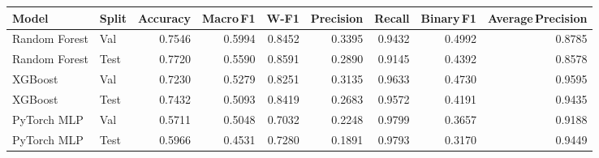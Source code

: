 \begin{tabular}{llrrrrrrr}
  \toprule
  Model & Split & Accuracy & Macro\,F1 & W-F1 & Precision & Recall & Binary\,F1 & Average\,Precision \\
  \midrule
  Random Forest & Val & 0.7546 & 0.5994 & 0.8452 & 0.3395 & 0.9432 & 0.4992 & 0.8785 \\
  Random Forest & Test & 0.7720 & 0.5590 & 0.8591 & 0.2890 & 0.9145 & 0.4392 & 0.8578 \\
  XGBoost & Val & 0.7230 & 0.5279 & 0.8251 & 0.3135 & 0.9633 & 0.4730 & 0.9595 \\
  XGBoost & Test & 0.7432 & 0.5093 & 0.8419 & 0.2683 & 0.9572 & 0.4191 & 0.9435 \\
  PyTorch MLP & Val & 0.5711 & 0.5048 & 0.7032 & 0.2248 & 0.9799 & 0.3657 & 0.9188 \\
  PyTorch MLP & Test & 0.5966 & 0.4531 & 0.7280 & 0.1891 & 0.9793 & 0.3170 & 0.9449 \\
  \bottomrule
\end{tabular}
